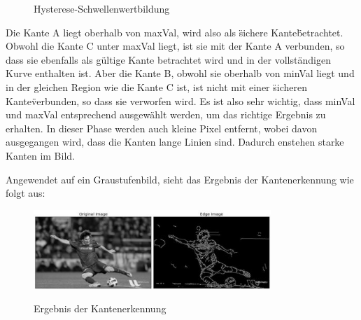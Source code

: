 \begin{compactenum}
\begin{compactenum}
\begin{figure}[H]
            \caption{Hysterese-Schwellenwertbildung}
            \cite{hysteresisPic}
            \label{fig:anpr:edge:hysteresis}
            \end{figure}
            Die Kante A liegt oberhalb von maxVal, wird also als \"sichere Kante\" betrachtet. Obwohl die Kante C unter maxVal liegt, ist sie mit der Kante A verbunden, so dass sie ebenfalls als gültige Kante betrachtet wird und in der vollständigen Kurve enthalten ist. Aber die Kante B, obwohl sie oberhalb von minVal liegt und in der gleichen Region wie die Kante C ist, ist nicht mit einer \"sicheren Kante\" verbunden, so dass sie verworfen wird. Es ist also sehr wichtig, dass minVal und maxVal entsprechend ausgewählt werden, um das richtige Ergebnis zu erhalten.
            In dieser Phase werden auch kleine Pixel entfernt, wobei davon ausgegangen wird, dass die Kanten lange Linien sind. Dadurch enstehen starke Kanten im Bild.
    \end{compactenum}
\end{compactenum}
Angewendet auf ein Graustufenbild, sieht das Ergebnis der Kantenerkennung wie folgt aus:
\begin{figure}[H]
    \centering
    \includegraphics[width=0.8\textwidth]{pics/canny1.jpg}
    \caption{Ergebnis der Kantenerkennung}
    \cite{CannyPic}
    \label{fig:anpr:edge:canny}
    \end{figure}
